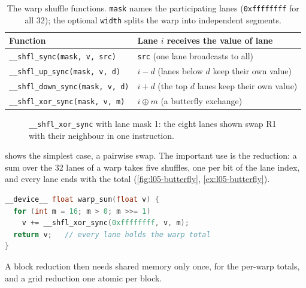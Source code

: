 \documentclass[../main.tex]{subfiles}
\begin{document}
\begin{table}[tb]
  \centering
  \small
  \caption{The warp shuffle functions.  \texttt{mask} names the
    participating lanes (\texttt{0xffffffff} for all 32); the optional
    \texttt{width} splits the warp into independent segments.}
  \label{tab:l05-shuffle}
  \begin{tabular}{>{\raggedright\arraybackslash}p{52mm}
                  >{\raggedright\arraybackslash}p{58mm}}
    \toprule
    Function & Lane $i$ receives the value of lane \\
    \midrule
    \texttt{\_\_shfl\_sync(mask, v, src)} & \texttt{src} (one lane
      broadcasts to all) \\
    \texttt{\_\_shfl\_up\_sync(mask, v, d)} & $i - d$ (lanes below $d$
      keep their own value) \\
    \texttt{\_\_shfl\_down\_sync(mask, v, d)} & $i + d$ (the top $d$
      lanes keep their own value) \\
    \texttt{\_\_shfl\_xor\_sync(mask, v, m)} & $i \oplus m$ (a
      butterfly exchange) \\
    \bottomrule
  \end{tabular}
\end{table}

\begin{figure}[tb]
  \centering
  
  \caption{\texttt{\_\_shfl\_xor\_sync} with lane mask 1: the eight
    lanes shown swap R1 with their neighbour in one instruction.}
  \label{fig:l05-shuffle-xor}
\end{figure}

 shows the simplest case, a pairwise swap.
The important use is the reduction: a sum over the 32 lanes of a warp
takes five shuffles, one per bit of the lane index, and every lane ends
with the total (\cref{fig:l05-butterfly}, \cref{ex:l05-butterfly}).
\begin{lstlisting}[language=C++, numbers=none]
__device__ float warp_sum(float v) {
  for (int m = 16; m > 0; m >>= 1)
    v += __shfl_xor_sync(0xffffffff, v, m);
  return v;   // every lane holds the warp total
}
\end{lstlisting}
A block reduction then needs shared memory only once, for the per-warp
totals, and a grid reduction one atomic per
block.
\end{document}
